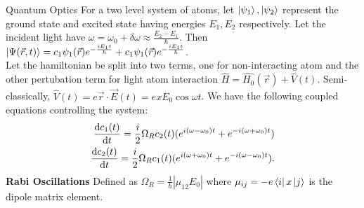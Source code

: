 \documentclass[pdf]{beamer}
\begin{document}
\begin{frame}{Quantum Optics}
  For a two level system of atoms, let $ \ket{\psi_{1}  }, \ket{\psi_{2}  } $ represent the ground state and excited state having energies $ E_1,E_2 $ respectively. Let the incident
  light have $ \omega = \omega_0 + \delta \omega \approx \frac{E_2-E_1}{\hbar}$.
   Then $     \ket{\Psi(\vec{r},t)} = c_{1} \psi_{1}(\vec{r})e^{-\frac{iE_1t}{\hbar}} + c_{1} \psi_{1}(\vec{r})e^{-\frac{iE_1t}{\hbar}} $. \\
  Let the hamiltonian be split into two terms, one for non-interacting atom and the other pertubation term for light atom interaction $ \hat{H} = \hat{H_{0}}(\vec{r})   + \hat{V}(t)   $.
  Semi-classically, $ \hat{V}(t) = e \vec{r}\cdot\vec{E}(t) = exE_0\cos \omega t $. We have the following coupled equations controlling the system:
  \begin{align*}
    \dv{c_1(t)}{t} = \frac{i}{2} \Omega_{R} c_2(t)(e^{i(\omega -\omega_0)t} + e^{-i(\omega +\omega_0)t} ) \\
     \dv{c_2(t)}{t} = \frac{i}{2} \Omega_{R} c_1(t)(e^{i(\omega +\omega_0)t} + e^{-i(\omega -\omega_0)t} )
  .\end{align*}
  \textbf{Rabi Oscillations}
  Defined as $ \Omega_{R} =\frac{1}{\hbar} |\mu_{12} E_0|  $ where $ \mu_{ij} = -e \bra{i}x\ket{j}   $ is the dipole matrix element. 
\end{frame}
\end{document}
